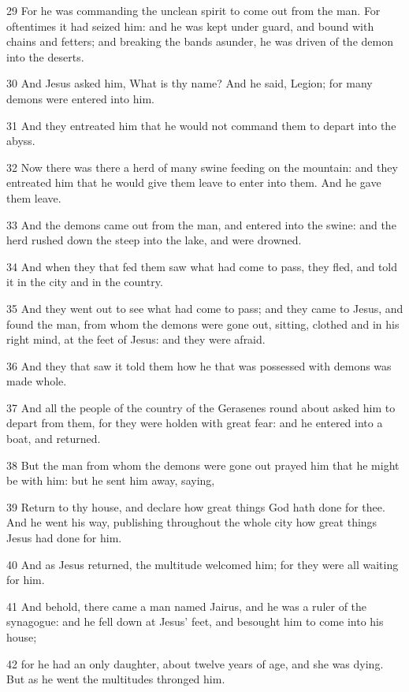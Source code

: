 \par 29 For he was commanding the unclean spirit to come out from the man. For oftentimes it had seized him: and he was kept under guard, and bound with chains and fetters; and breaking the bands asunder, he was driven of the demon into the deserts.
\par 30 And Jesus asked him, What is thy name? And he said, Legion; for many demons were entered into him.
\par 31 And they entreated him that he would not command them to depart into the abyss.
\par 32 Now there was there a herd of many swine feeding on the mountain: and they entreated him that he would give them leave to enter into them. And he gave them leave.
\par 33 And the demons came out from the man, and entered into the swine: and the herd rushed down the steep into the lake, and were drowned.
\par 34 And when they that fed them saw what had come to pass, they fled, and told it in the city and in the country.
\par 35 And they went out to see what had come to pass; and they came to Jesus, and found the man, from whom the demons were gone out, sitting, clothed and in his right mind, at the feet of Jesus: and they were afraid.
\par 36 And they that saw it told them how he that was possessed with demons was made whole.
\par 37 And all the people of the country of the Gerasenes round about asked him to depart from them, for they were holden with great fear: and he entered into a boat, and returned.
\par 38 But the man from whom the demons were gone out prayed him that he might be with him: but he sent him away, saying,
\par 39 Return to thy house, and declare how great things God hath done for thee. And he went his way, publishing throughout the whole city how great things Jesus had done for him.
\par 40 And as Jesus returned, the multitude welcomed him; for they were all waiting for him.
\par 41 And behold, there came a man named Jairus, and he was a ruler of the synagogue: and he fell down at Jesus' feet, and besought him to come into his house;
\par 42 for he had an only daughter, about twelve years of age, and she was dying. But as he went the multitudes thronged him.
